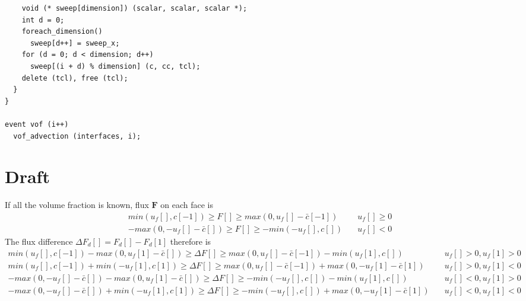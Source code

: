 \documentclass[a4paper]{article}
\newcommand{\func}[1]{\textbf{\textcolor{function}{#1}}}
\begin{document}
\begin{center}
\end{center}

\begin{multicols}{2}
 \columnbreak
 \begin{verbatim}
    void (* sweep[dimension]) (scalar, scalar, scalar *);
    int d = 0;
    foreach_dimension()
      sweep[d++] = sweep_x;
    for (d = 0; d < dimension; d++)
      sweep[(i + d) % dimension] (c, cc, tcl);
    delete (tcl), free (tcl);
  }
}

event vof (i++)
  vof_advection (interfaces, i);
 \end{verbatim}
\end{multicols}

\section{Draft}
If all the volume fraction is known, flux $\mathbf{F}$ on each face is
\begin{align}
    min(u_f[],c[-1])\geq F[] \geq max(0,u_f[]-\bar{c}[-1])\quad &u_f[]\geq0\\
    -max(0,-u_f[]-\bar{c}[])\geq F[] \geq -min(-u_f[],c[])\quad &u_f[]<0
\end{align}
The flux difference $\Delta F_d[] = F_d[]-F_d[1]$ therefore is
\begin{align}
    min(u_f[],c[-1])-max(0,u_f[1]-\bar{c}[])\geq \Delta F[]\geq max(0,u_f[]-\bar{c}[-1]) - min(u_f[1],c[])\quad &u_f[]>0,u_f[1]>0\\
    min(u_f[],c[-1]) + min(-u_f[1],c[1])\geq \Delta F[]\geq max(0,u_f[]-\bar{c}[-1]) + max(0,-u_f[1]-\bar{c}[1])\quad &u_f[]>0,u_f[1]<0\\
    -max(0,-u_f[]-\bar{c}[])-max(0,u_f[1]-\bar{c}[])\geq \Delta F[]\geq -min(-u_f[],c[]) - min(u_f[1],c[])\quad &u_f[]<0,u_f[1]>0\\
    -max(0,-u_f[]-\bar{c}[])+ min(-u_f[1],c[1])\geq \Delta F[]\geq -min(-u_f[],c[]) + max(0,-u_f[1]-\bar{c}[1])\quad &u_f[]<0,u_f[1]<0
\end{align}
\printbibliography
\end{document}
